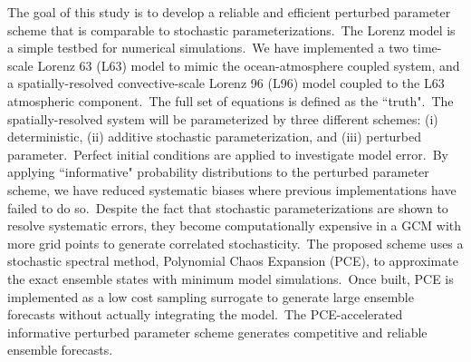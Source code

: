 
The goal of this study is to develop a reliable and efficient perturbed parameter scheme
that is comparable to stochastic parameterizations.\ 
The Lorenz model is a simple testbed for numerical simulations.\
We have implemented a two time-scale Lorenz 63 (L63) model
to mimic the ocean-atmosphere coupled system, and 
a spatially-resolved convective-scale Lorenz 96 (L96) model 
coupled to the L63 atmospheric component.\
The full set of equations is defined as the ``truth".\
The spatially-resolved system will be parameterized 
by three different schemes: (i) deterministic, (ii) additive stochastic parameterization, and (iii) perturbed parameter.\
Perfect initial conditions are applied to investigate model error.\
By applying ``informative" probability distributions to the perturbed parameter scheme,
we have reduced systematic biases where previous implementations have failed to do so.\
Despite the fact that stochastic parameterizations are shown to resolve systematic errors,
they become computationally expensive in a GCM with 
more grid points to generate correlated stochasticity.\ 
The proposed scheme uses a stochastic spectral method,
Polynomial Chaos Expansion (PCE),
to approximate the exact ensemble states with minimum model simulations.\
Once built, PCE is implemented as a low cost sampling 
surrogate to generate large ensemble forecasts without actually integrating the model.\
The PCE-accelerated informative perturbed parameter scheme
generates competitive and reliable ensemble forecasts.\


